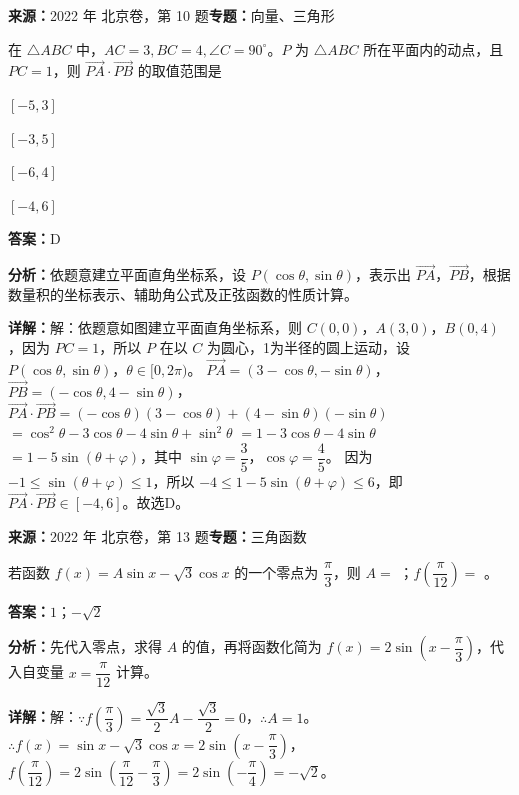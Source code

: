 \begin{question}[points=4]
\textbf{来源：}2022 年 北京卷，第 10 题\quad \textbf{专题：}向量、三角形\par
在 $\triangle ABC$ 中，$AC = 3, BC = 4, \angle C = 90^\circ$。$P$ 为 $\triangle ABC$ 所在平面内的动点，且 $PC = 1$，则 $\overrightarrow{PA} \cdot \overrightarrow{PB}$ 的取值范围是
\begin{choices}
  \item $[-5,3]$
  \item $[-3,5]$
  \item $[-6,4]$
  \item $[-4,6]$
\end{choices}
\begin{solution}
\textbf{答案：}D

\textbf{分析：}依题意建立平面直角坐标系，设 $P(\cos\theta,\sin\theta)$，表示出 $\overrightarrow{PA}$，$\overrightarrow{PB}$，根据数量积的坐标表示、辅助角公式及正弦函数的性质计算。

\textbf{详解：}解：依题意如图建立平面直角坐标系，则 $C(0,0)$，$A(3,0)$，$B(0,4)$，因为 $PC=1$，所以 $P$ 在以 $C$ 为圆心，1为半径的圆上运动，设 $P(\cos\theta,\sin\theta)$，$\theta \in [0,2\pi)$。
$\overrightarrow{PA} = (3-\cos\theta, -\sin\theta)$，$\overrightarrow{PB} = (-\cos\theta, 4-\sin\theta)$，
$\overrightarrow{PA} \cdot \overrightarrow{PB} = (-\cos\theta)(3-\cos\theta) + (4-\sin\theta)(-\sin\theta)$
$= \cos^2\theta - 3\cos\theta - 4\sin\theta + \sin^2\theta$
$= 1 - 3\cos\theta - 4\sin\theta$
$= 1 - 5\sin(\theta + \varphi)$，其中 $\sin\varphi = \dfrac{3}{5}$，$\cos\varphi = \dfrac{4}{5}$。
因为 $-1 \leq \sin(\theta + \varphi) \leq 1$，所以 $-4 \leq 1 - 5\sin(\theta + \varphi) \leq 6$，即 $\overrightarrow{PA} \cdot \overrightarrow{PB} \in [-4,6]$。故选D。
\end{solution}
\end{question}

\begin{question}[points=5]
\textbf{来源：}2022 年 北京卷，第 13 题\quad \textbf{专题：}三角函数\par
若函数 $f(x) = A\sin x - \sqrt{3}\cos x$ 的一个零点为 $\dfrac{\pi}{3}$，则 $A =$ ；$f\left(\dfrac{\pi}{12}\right) =$ 。
\fillin[{$1$；$-\sqrt{2}$}]
\begin{solution}
\textbf{答案：}$1$；$-\sqrt{2}$

\textbf{分析：}先代入零点，求得 $A$ 的值，再将函数化简为 $f(x) = 2\sin\left(x - \dfrac{\pi}{3}\right)$，代入自变量 $x = \dfrac{\pi}{12}$ 计算。

\textbf{详解：}解：$\because f\left(\dfrac{\pi}{3}\right) = \dfrac{\sqrt{3}}{2}A - \dfrac{\sqrt{3}}{2} = 0$，$\therefore A = 1$。
$\therefore f(x) = \sin x - \sqrt{3}\cos x = 2\sin\left(x - \dfrac{\pi}{3}\right)$，
$f\left(\dfrac{\pi}{12}\right) = 2\sin\left(\dfrac{\pi}{12} - \dfrac{\pi}{3}\right) = 2\sin\left(-\dfrac{\pi}{4}\right) = -\sqrt{2}$。
\end{solution}
\end{question}

